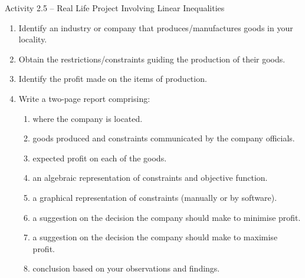 \begin{activity}{Activity 2.5 -- Real Life Project Involving Linear Inequalities}
\begin{enumerate}
  \item Identify an industry or company that produces/manufactures goods in
  your locality.
  \item Obtain the restrictions/constraints guiding the production of their goods.
  \item Identify the profit made on the items of production.
  \item Write a two-page report comprising:
  \begin{enumerate}
    \item[a.] where the company is located.
    \item[b.] goods produced and constraints communicated by the company
    officials.
    \item[c.] expected profit on each of the goods.
    \item[d.] an algebraic representation of constraints and objective function.
    \item[e.] a graphical representation of constraints (manually or by software).
    \item[f.] a suggestion on the decision the company should make to minimise
    profit.
    \item[g.] a suggestion on the decision the company should make to maximise
    profit.
    \item[h.] conclusion based on your observations and findings.
  \end{enumerate}
\end{enumerate}
\end{activity}
